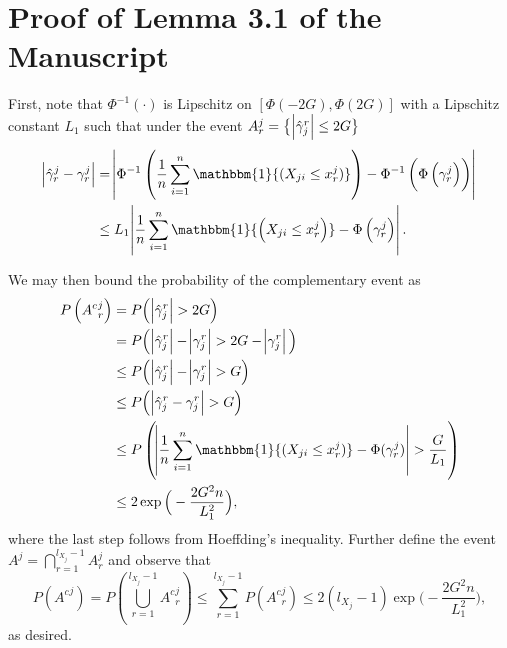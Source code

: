 \section{Proof of Lemma 3.1 of the Manuscript %
}\label{lemma_threshold_proof}

First, note that $\Phi^{-1}(\cdot)$ is Lipschitz on $[\Phi(-2G),\Phi(2G)]$ with a Lipschitz constant $L_1$ such that under the event $A_r^j = \big\{\abs{\hat{\gamma}_j^r} \leq 2G\big\}$
\begin{equation*}
    \begin{split}
        \abs{\hat{\gamma}_r^j - \gamma_r^j} &= \abs{\Phi^{-1}\left(\frac{1}{n} \sum_{i=1}^n \mathbbm{1}{(X_{ji} \leq x_r^j)}\right) - \Phi^{-1}\left(\Phi\left(\gamma_r^j\right)\right)} \\
        &\leq L_1\abs{\frac{1}{n} \sum_{i=1}^n \mathbbm{1}{\left(X_{ji} \leq x_r^j\right)} - \Phi\left(\gamma_r^j\right)}.
    \end{split}
\end{equation*}

We may then bound the probability of the complementary event as
\begin{equation*}
\begin{split}
    P\left({A^c}_{r}^{j}\right) &= P\Big(\abs{\hat{\gamma}_j^r} > 2G\Big) \\
                     &= P\Big(\abs{\hat{\gamma}_j^r} - \abs{\gamma_j^r} > 2G - \abs{\gamma_j^r}\Big) \\
                     &\leq P\Big(\abs{\hat{\gamma}_j^r} - \abs{\gamma_j^r} > G\Big) \\
                     &\leq P\Big(\abs{\hat{\gamma}_j^r - \gamma_j^r} > G\Big) \\
                     &\leq P\left(\abs{\frac{1}{n} \sum_{i=1}^n \mathbbm{1}{(X_{ji} \leq x_r^j)} - \Phi(\gamma_r^j)} > \frac{G}{L_1}\right) \\ 
                     &\leq 2\exp{\Big(- \frac{2G^2n}{L_1^2}\Big)},
\end{split} 
\end{equation*}
where the last step follows from Hoeffding's inequality. Further define the event $A^j = \bigcap_{r=1}^{l_{X_j}-1} A_r^j$ and observe that
\begin{equation*}
    P\left({A^c}^j\right) = P\left(\bigcup_{r=1}^{l_{X_j}-1} {A^c}_r^j\right) \leq \sum_{r=1}^{l_{X_j}-1} P({A^c}_r^j) \leq 2(l_{X_j}-1)\exp{\Big(- \frac{2G^2n}{L_1^2}\Big)},
\end{equation*}
as desired. 



